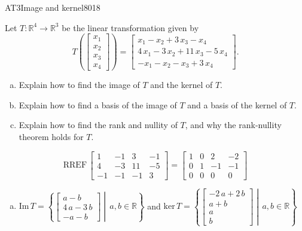 \begin{exercise}{AT3}{Image and kernel}{8018} 
\begin{exerciseStatement} 

 Let \(T:\mathbb{R}^4 \to \mathbb{R}^3\) be the linear transformation given by \[T\left( \left[\begin{array}{c}
x_{1} \\
x_{2} \\
x_{3} \\
x_{4}
\end{array}\right] \right) = \left[\begin{array}{c}
x_{1} - x_{2} + 3 \, x_{3} - x_{4} \\
4 \, x_{1} - 3 \, x_{2} + 11 \, x_{3} - 5 \, x_{4} \\
-x_{1} - x_{2} - x_{3} + 3 \, x_{4}
\end{array}\right].\] 

 

\begin{enumerate}[(a)]
\item Explain how to find the image of \(T\) and the kernel of \(T\).
\item Explain how to find a basis of the image of \(T\) and a basis of the kernel of \(T\).
\item Explain how to find the rank and nullity of \(T\), and why the rank-nullity theorem holds for \(T\).
\end{enumerate}

     \end{exerciseStatement}
 \begin{exerciseAnswer} 

\[\mathrm{RREF}\,\left[\begin{array}{cccc}
1 & -1 & 3 & -1 \\
4 & -3 & 11 & -5 \\
-1 & -1 & -1 & 3
\end{array}\right]=\left[\begin{array}{cccc}
1 & 0 & 2 & -2 \\
0 & 1 & -1 & -1 \\
0 & 0 & 0 & 0
\end{array}\right]\]

 

\begin{enumerate}[(a)]
\item  

 \(\mathrm{Im}\,T =  \left\{ \left[\begin{array}{c}
a - b \\
4 \, a - 3 \, b \\
-a - b
\end{array}\right] \middle|\,a,b\in\mathbb{R}\right\}\) and \(\mathrm{ker}\,T = \left\{ \left[\begin{array}{c}
-2 \, a + 2 \, b \\
a + b \\
a \\
b
\end{array}\right] \middle|\,a,b\in\mathbb{R}\right\}\) 


\end{enumerate}
\end{exerciseAnswer}
\end{exercise}
